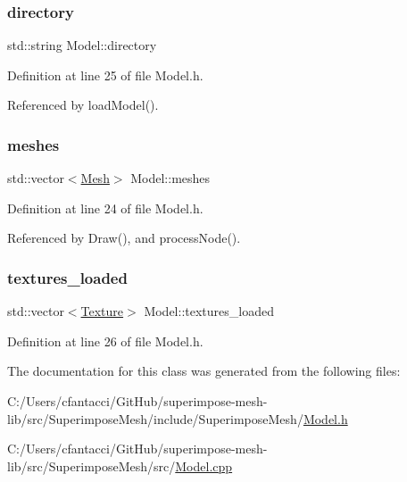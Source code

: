 \subsubsection{\texorpdfstring{directory}{directory}}
{\footnotesize\ttfamily std\+::string Model\+::directory\hspace{0.3cm}{\ttfamily [private]}}



Definition at line 25 of file Model.\+h.



Referenced by load\+Model().

\mbox{\label{classModel_a538e42901dcfba59471072a48a162163}} 
\subsubsection{\texorpdfstring{meshes}{meshes}}
{\footnotesize\ttfamily std\+::vector$<$\mbox{\hyperlink{classMesh}{Mesh}}$>$ Model\+::meshes\hspace{0.3cm}{\ttfamily [private]}}



Definition at line 24 of file Model.\+h.



Referenced by Draw(), and process\+Node().

\mbox{\label{classModel_a866353fd9967b57286864fac87799ae1}} 
\subsubsection{\texorpdfstring{textures\+\_\+loaded}{textures\_loaded}}
{\footnotesize\ttfamily std\+::vector$<$\mbox{\hyperlink{structTexture}{Texture}}$>$ Model\+::textures\+\_\+loaded\hspace{0.3cm}{\ttfamily [private]}}



Definition at line 26 of file Model.\+h.



The documentation for this class was generated from the following files\+:\begin{DoxyCompactItemize}
\item 
C\+:/\+Users/cfantacci/\+Git\+Hub/superimpose-\/mesh-\/lib/src/\+Superimpose\+Mesh/include/\+Superimpose\+Mesh/\mbox{\hyperlink{Model_8h}{Model.\+h}}\item 
C\+:/\+Users/cfantacci/\+Git\+Hub/superimpose-\/mesh-\/lib/src/\+Superimpose\+Mesh/src/\mbox{\hyperlink{Model_8cpp}{Model.\+cpp}}\end{DoxyCompactItemize}
